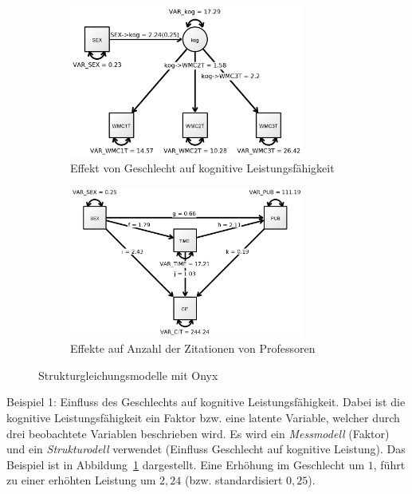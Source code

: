\documentclass{article}
\numberwithin{equation}{section}
\begin{document}
\begin{figure}
  \centering
  \captionsetup{justification=centering}
  \begin{subfigure}[b]{0.48\textwidth}
    \centering
    \includegraphics[width=0.85\textwidth]{images/onyx/onyx_kog.png}
    \caption{Effekt von Geschlecht auf kognitive Leistungsfähigkeit}
    \label{img:onyx-kog}
  \end{subfigure}
  \begin{subfigure}[b]{0.48\textwidth}
    \centering
    \includegraphics[width=0.85\textwidth]{images/onyx/onyx_cit.png}
    \caption{Effekte auf Anzahl der Zitationen von Professoren}
    \label{img:onyx-cit}
  \end{subfigure}
  \caption{Strukturgleichungsmodelle mit Onyx}
\end{figure}

Beispiel 1: Einfluss des Geschlechts auf kognitive Leistungsfähigkeit. Dabei ist die kognitive Leistungsfähigkeit ein Faktor bzw. eine latente Variable, welcher durch drei beobachtete Variablen beschrieben wird. Es wird ein \emph{Messmodell} (Faktor) und ein \emph{Strukturodell} verwendet (Einfluss Geschlecht auf kognitive Leistung). Das Beispiel ist in Abbildung~\ref{img:onyx-kog} dargestellt. Eine Erhöhung im Geschlecht um $1$, führt zu einer erhöhten Leistung um $2,24$ (bzw. standardisiert $0,25$).
\end{document}
